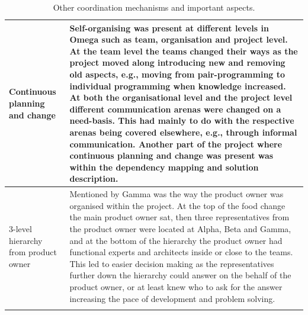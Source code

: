 \begin{center}
\begin{longtable}{| p{6cm} | p{9cm} |}
    Continuous planning and change & Self-organising was present at different levels in Omega such as team, organisation and project level. At the team level the teams changed their ways as the project moved along introducing new and removing old aspects, e.g., moving from pair-programming to individual programming when knowledge increased. At both the organisational level and the project level different communication arenas were changed on a need-basis. This had mainly to do with the respective arenas being covered elsewhere, e.g., through informal communication. Another part of the project where continuous planning and change was present was within the dependency mapping and solution description. \\ \hline
    3-level hierarchy from product owner & Mentioned by Gamma was the way the product owner was organised within the project. At the top of the food change the main product owner sat, then three representatives from the product owner were located at Alpha, Beta and Gamma, and at the bottom of the hierarchy the product owner had functional experts and architects inside or close to the teams. This led to easier decision making as the representatives further down the hierarchy could answer on the behalf of the product owner, or at least knew who to ask for the answer increasing the pace of development and problem solving. \\ \hline

    \caption{Other coordination mechanisms and important aspects.}
    \label{ocmaia}
    \end{longtable}
\end{center}